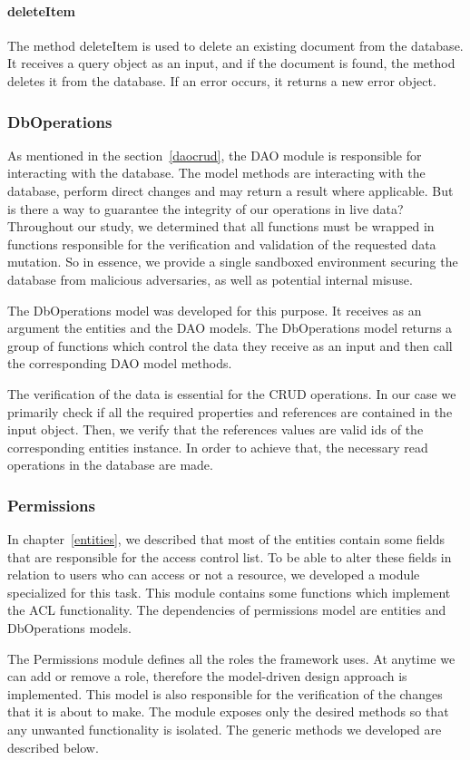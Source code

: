 \paragraph{deleteItem}
The method deleteItem is used to delete an existing document from the database. It receives a query object as an input, and if the document is found, the method deletes it from the database. If an error occurs, it returns a new error object.

\subsubsection{DbOperations}
As mentioned in the section~\ref{daocrud}, the DAO module is responsible for interacting with the database. The model methods are interacting with the database, perform direct changes and may return a result where applicable. But is there a way to guarantee the integrity of our operations in live data? Throughout our study, we determined that all functions must be wrapped in functions responsible for the verification and validation of the requested data mutation. So in essence, we provide a single sandboxed environment securing the database from malicious adversaries, as well as potential internal misuse. \par 
	The DbOperations model was developed for this purpose. It receives as an argument the entities and the DAO models. The DbOperations model returns a group of functions which control the data they receive as an input and then call the corresponding DAO model methods. \par 
	The verification of the data is essential for the CRUD operations. In our case we primarily check if all the required properties and references are contained in the input object. Then, we verify that the references values are valid ids of the corresponding entities instance. In order to achieve that, the necessary read operations in the database are made.
	
\subsubsection{Permissions}
In chapter~\ref{entities}, we described that most of the entities contain some fields that are responsible for the access control list. To be able to alter these fields in relation to users who can access or not a resource, we developed a module specialized for this task. This module contains some functions which implement the ACL functionality. The dependencies of permissions model are entities and DbOperations models. \par 
	The Permissions module defines all the roles the framework uses. At anytime we can add or remove a role, therefore the model-driven design approach is implemented. This model is also responsible for the verification of the changes that it is about to make. The module exposes only the desired methods so that any unwanted functionality is isolated. The generic methods we developed are described below. 

